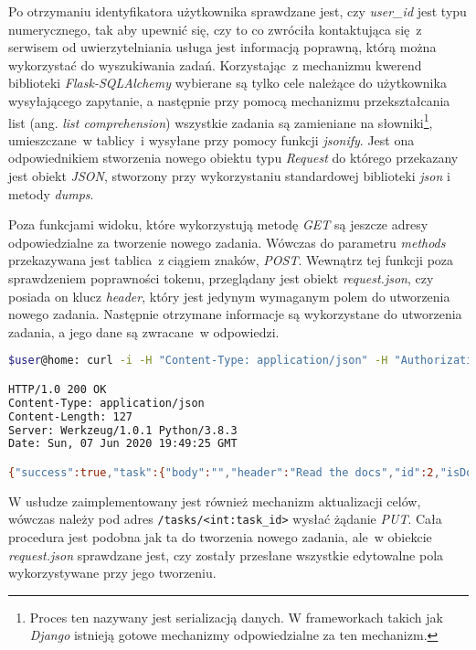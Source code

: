 Po otrzymaniu identyfikatora użytkownika sprawdzane jest, czy \textit{user\_id} jest typu numerycznego, tak aby upewnić się, czy to co zwróciła kontaktująca się~z serwisem od uwierzytelniania usługa jest informacją poprawną, którą można wykorzystać do wyszukiwania zadań. Korzystając~z mechanizmu kwerend biblioteki \textit{Flask-SQLAlchemy} wybierane są tylko cele należące do użytkownika wysyłającego zapytanie, a następnie przy pomocą mechanizmu przekształcania list (ang. \textit{list comprehension})\cite{python} wszystkie zadania są zamieniane na słowniki\footnote{Proces ten nazywany jest serializacją danych. W frameworkach takich jak \textit{Django} istnieją gotowe mechanizmy odpowiedzialne za ten mechanizm\cite{django}.}, umieszczane~w tablicy~i wysyłane przy pomocy funkcji \textit{jsonify}. Jest ona odpowiednikiem stworzenia nowego obiektu typu \textit{Request} do którego przekazany jest obiekt \textit{JSON}, stworzony przy wykorzystaniu standardowej biblioteki \textit{json} i metody \textit{dumps}\cite{flask}.

Poza funkcjami widoku, które wykorzystują metodę \textit{GET} są jeszcze adresy odpowiedzialne za tworzenie nowego zadania. Wówczas do parametru \textit{methods} przekazywana jest tablica~z ciągiem znaków, \textit{POST}. Wewnątrz tej funkcji poza sprawdzeniem poprawności tokenu, przeglądany jest obiekt \textit{request.json}, czy posiada on klucz \textit{header}, który jest jedynym wymaganym polem do utworzenia nowego zadania. Następnie otrzymane informacje są wykorzystane do utworzenia zadania, a jego dane są zwracane~w odpowiedzi.
\begin{lstlisting}[language=bash, caption={Testowe zapytanie \textit{POST} wykonane przy pomocy programu \textit{cURL} w terminalu systemu \textit{Unix}.}]
$user@home: curl -i -H "Content-Type: application/json" -H "Authorization: Bearer token_uzytkownika "  -X POST -d '{"header":"Read the docs"}' http://localhost:5001/tasks

HTTP/1.0 200 OK
Content-Type: application/json
Content-Length: 127
Server: Werkzeug/1.0.1 Python/3.8.3
Date: Sun, 07 Jun 2020 19:49:25 GMT

{"success":true,"task":{"body":"","header":"Read the docs","id":2,"isDone":false,"timestamp":"Sun, 07 Jun 2020 19:49:25 GMT"}}
\end{lstlisting}


W usłudze zaimplementowany jest również mechanizm aktualizacji celów, wówczas należy pod adres \verb|/tasks/<int:task_id>| wysłać żądanie \textit{PUT}. Cała procedura jest podobna jak ta do tworzenia nowego zadania, ale~w obiekcie \textit{request.json} sprawdzane jest, czy zostały przesłane wszystkie edytowalne pola wykorzystywane przy jego tworzeniu.

